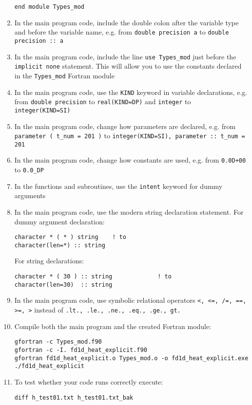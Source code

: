 \documentclass[12pt]{article}
\begin{document}
\begin{enumerate}
\begin{verbatim}
end module Types_mod
\end{verbatim}
\item In the main program code, include the double colon after the variable type and before 
the variable name, e.g. from \texttt{double precision a} to \texttt{double precision :: a}
\item In the main program code, include the line \texttt{use Types\_mod} just before
the \texttt{implicit none} statement. This will allow you to use the constants declared in the
\texttt{Types\_mod} Fortran module
\item In the main program code, use the \texttt{KIND} keyword in variable declarations, e.g.
from \texttt{double precision} to \texttt{real(KIND=DP)} and \texttt{integer} to 
\texttt{integer(KIND=SI)}
\item In the main program code, change how parameters are declared, e.g. from 
\texttt{parameter ( t\_num = 201 )} to \texttt{integer(KIND=SI), parameter :: t\_num = 201}
\item In the main program code, change how constants are used, e.g. from \texttt{0.0D+00} to 
\texttt{0.0\_DP}
\item In the functions and subroutines, use the \texttt{intent} keyword for dummy arguments
\item In the main program code, use the modern string declaration statement. For dummy argument
declaration:
\begin{verbatim}
character * ( * ) string    ! to
character(len=*) :: string
\end{verbatim}
For string declarations:
\begin{verbatim}
character * ( 30 ) :: string             ! to
character(len=30)  :: string
\end{verbatim}
\item In the main program code, use symbolic relational operators \texttt{<, <=, /=, ==, >=, >}
instead of \texttt{.lt., .le., .ne., .eq., .ge., gt.}
\item Compile both the main program and the created Fortran module:
\begin{verbatim}
gfortran -c Types_mod.f90
gfortran -c -I. fd1d_heat_explicit.f90
gfortran fd1d_heat_explicit.o Types_mod.o -o fd1d_heat_explicit.exe
./fd1d_heat_explicit
\end{verbatim}
\item To test whether your code runs correctly execute:
\begin{verbatim}
diff h_test01.txt h_test01.txt_bak
\end{verbatim}

\end{enumerate}
\end{document}
